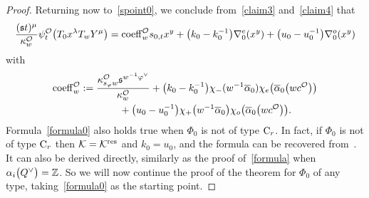 \documentclass[11pt]{article}
\numberwithin{equation}{section}
\numberwithin{equation}{section}
\begin{document}
\begin{proof}
Returning now to~\eqref{spoint0},
we conclude from~\eqref{claim3} and~\eqref{claim4} that
\begin{equation}\label{formula0}
\frac{(\mathfrak{s}t)^\mu}{\kappa_w^\mathcal{O}}\psi_{t}^\mathcal{O}\bigl(T_0x^\lambda T_wY^\mu\bigr)
={\rm coeff}_w^\mathcal{O}s_{0,t}x^y+\bigl(k_0-k_0^{-1}\bigr)\nabla_0^e(x^y)+\bigl(u_0-u_0^{-1}\bigr)\nabla_0^o(x^y)
\end{equation}
with
\begin{gather}
{\rm coeff}_w^\mathcal{O}:=\frac{\kappa_{s_\varphi w}^\mathcal{O}\mathfrak{s}^{w^{-1}\varphi^\vee}}{\kappa_w^\mathcal{O}}+\bigl(k_0-k_0^{-1}\bigr)\chi_-(w^{-1}\overline{\alpha}_0)\chi_e \bigl(\overline{\alpha}_0\bigl(wc^\mathcal{O}\bigr)\bigr)\nonumber\\
\hphantom{{\rm coeff}_w^\mathcal{O}:=}{}
+\bigl(u_0-u_0^{-1}\bigr)\chi_+\bigl(w^{-1}\overline{\alpha}_0\bigr)\chi_o\bigl(\overline{\alpha}_0\bigl(wc^\mathcal{O}\bigr)\bigr).
\label{coeff}
\end{gather}
Formula~\eqref{formula0} also holds true when $\Phi_0$ is not of type ${\rm C}_r$. In fact, if $\Phi_0$ is not of type ${\rm C}_r$ then $\mathcal{K}=\mathcal{K}^{{\rm res}}$ and $k_0=u_0$,
and the formula can be recovered from~\cite[Section~5]{SSV2}. It can also be derived directly, similarly as the proof of~\eqref{formula} when $\alpha_i\smash{\bigl(Q^\vee\bigr)}=\mathbb{Z}$.
So we will now continue the proof of the theorem for $\Phi_0$ of any type, taking~\eqref{formula0} as the starting point.


\end{proof}
\end{document}
